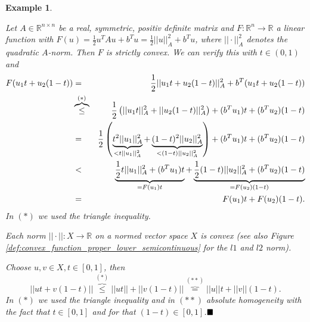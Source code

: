 \documentclass[abstracton]{scrreprt}
\newcommand{\qed}{$\hfill\blacksquare$}
\newtheorem{example}[theorem]{Example}
\newenvironment{proof}[1][Proof]{\begin{trivlist}
\item[\hskip \labelsep {\bfseries #1}]}{\end{trivlist}}
\begin{document}
        \begin{example} %
        \label{ex:convex_function}
            \begin{enumerate}
                \item Let $A \in \mathbb{R}^{n \times n}$ be a real, symmetric, positiv definite matrix and $F: \mathbb{R}^{n} \longrightarrow \mathbb{R}$ a linear function with $F(u) = \frac{1}{2}u^{T}Au + b^{T}u = \frac{1}{2}||u||_{A}^{2} + b^{T}u$, where $||\cdot||_{A}^{2}$ denotes the quadratic $A$-norm. Then $F$ is strictly convex. We can verify this with $t \in (0, 1)$ and
                    \begin{eqnarray}
                        F(u_{1}t + u_{2}(1-t)) &=& \frac{1}{2} ||u_{1}t + u_{2}(1-t)||_{A}^{2} + b^{T}(u_{1}t + u_{2}(1-t)) \notag \\
                        &\overbrace{\le}^{(\ast)}& \frac{1}{2} \left(||u_{1}t||_{A}^{2} + ||u_{2}(1-t)||_{A}^{2}\right) + (b^{T}u_{1})t + (b^{T}u_{2})(1-t) \notag \\
                        &=& \frac{1}{2} \left( \underbrace{t^{2}||u_{1}||_{A}^{2}}_{< t||u_{1}||_{A}^{2}} + \underbrace{(1-t)^{2}||u_{2}||_{A}^{2}}_{< (1-t)||u_{2}||_{A}^{2}} \right) + (b^{T}u_{1})t + (b^{T}u_{2})(1-t) \notag \\
                        &<& \underbrace{\frac{1}{2} t||u_{1}||_{A}^{2} + (b^{T}u_{1})t}_{= F(u_{1})t} + \underbrace{\frac{1}{2} (1-t)||u_{2}||_{A}^{2} + (b^{T}u_{2})(1-t)}_{= F(u_{2})(1-t)} \notag \\
                        &=& F(u_{1})t + F(u_{2})(1-t). \notag
                    \end{eqnarray}
                In $(\ast)$ we used the triangle inequality.
                \item Each norm $||\cdot||: X \longrightarrow \mathbb{R}$ on a normed vector space $X$ is convex (see also Figure \ref{def:convex_function_proper_lower_semicontinuous} for the $l1$ and $l2$ norm).
                    \begin{proof} %
                        Choose $u, v \in X, t \in [0, 1]$, then
                        $$
                            ||ut + v(1 - t)|| \overbrace{\le}^{(\ast)} ||ut|| + ||v(1 - t)|| \overbrace{=}^{(\ast\ast)} ||u|| t + ||v|| (1 - t).
                        $$
                        In $(\ast)$ we used the triangle inequality and in $(\ast\ast)$ absolute homogeneity with the fact that $t \in [0, 1]$ and for that $(1-t) \in [0,1]$.\qed
                    \end{proof}
            \end{enumerate}
        \end{example}
\end{document}
